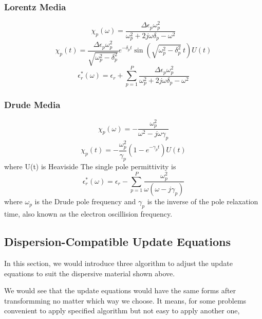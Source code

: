 \subsubsection{Lorentz Media}
\begin{equation}
  \chi_p(\omega) = \frac{\Delta\epsilon_p\omega_p^2}{\omega_p^2 + 2j\omega\delta_p - \omega^2}  
\end{equation}
\begin{equation}
  \chi_p(t) = \frac{\Delta \epsilon_p \omega_p^2}{\sqrt{\omega_p^2 - \delta_p^2}}e^{-\delta_p t}\sin\left(\sqrt{\omega_p^2-\delta_p^2}\ t\right)U(t)
\end{equation}
\begin{equation}
  \epsilon_r^*(\omega) = \epsilon_r + \sum_{p=1}^P \frac{\Delta\epsilon_p\omega_p^2}{\omega_p^2 + 2j\omega\delta_p - \omega^2}  
\end{equation}


\subsubsection{Drude Media}
\begin{equation}
  \chi_p(\omega) = -\frac{\omega_p^2}{\omega^2 - j\omega\gamma_p}  
\end{equation}
\begin{equation}
  \chi_p(t) = -\frac{\omega_p^2}{\gamma_p}\left(1-e^{-\gamma_p t}\right) U(t)
\end{equation}
where U(t) is Heaviside
The single pole permittivity is 
\begin{equation}
  \epsilon_r^*(\omega) = \epsilon_r - \sum_{p=1}^P \frac{\omega_p^2}{\omega(\omega-j\gamma_p)}
\end{equation}
where $\omega_p$ is the Drude pole frequency and $\gamma_p$ is the inverse of the pole relaxation time, also known as the
electron oscillision frequency.



\subsection{Dispersion-Compatible Update Equations}
In this section, we would introduce three algorithm to adjust the update equations to suit the dispersive material shown
above.

We would see that the update equations would have the same forms after transformming no matter which way we choose. It
means, for some problems convenient to apply specified algorithm but not easy to apply another one, 

